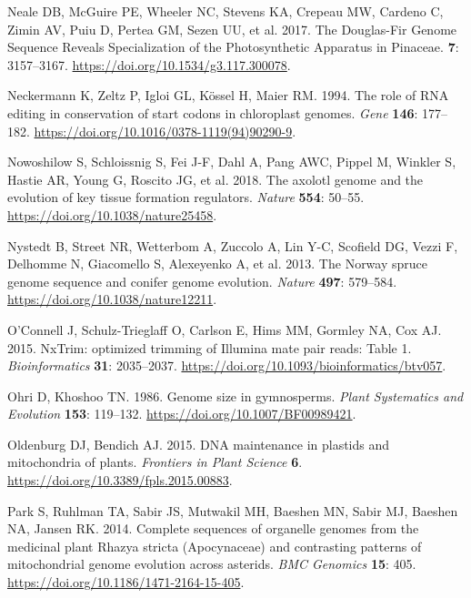 \documentclass[
  12pt,
  oneside,
  openany]{book}
\begin{document}
\leavevmode\hypertarget{ref-Neale_2017}{}%
Neale DB, McGuire PE, Wheeler NC, Stevens KA, Crepeau MW, Cardeno C, Zimin AV, Puiu D, Pertea GM, Sezen UU, et al. 2017. The Douglas-Fir Genome Sequence Reveals Specialization of the Photosynthetic Apparatus in Pinaceae. \textbf{7}: 3157--3167. \url{https://doi.org/10.1534/g3.117.300078}.

\leavevmode\hypertarget{ref-Neckermann_1994}{}%
Neckermann K, Zeltz P, Igloi GL, Kössel H, Maier RM. 1994. The role of RNA editing in conservation of start codons in chloroplast genomes. \emph{Gene} \textbf{146}: 177--182. \url{https://doi.org/10.1016/0378-1119(94)90290-9}.

\leavevmode\hypertarget{ref-Nowoshilow_2018}{}%
Nowoshilow S, Schloissnig S, Fei J-F, Dahl A, Pang AWC, Pippel M, Winkler S, Hastie AR, Young G, Roscito JG, et al. 2018. The axolotl genome and the evolution of key tissue formation regulators. \emph{Nature} \textbf{554}: 50--55. \url{https://doi.org/10.1038/nature25458}.

\leavevmode\hypertarget{ref-Nystedt_2013}{}%
Nystedt B, Street NR, Wetterbom A, Zuccolo A, Lin Y-C, Scofield DG, Vezzi F, Delhomme N, Giacomello S, Alexeyenko A, et al. 2013. The Norway spruce genome sequence and conifer genome evolution. \emph{Nature} \textbf{497}: 579--584. \url{https://doi.org/10.1038/nature12211}.

\leavevmode\hypertarget{ref-O_Connell_2015}{}%
O'Connell J, Schulz-Trieglaff O, Carlson E, Hims MM, Gormley NA, Cox AJ. 2015. NxTrim: optimized trimming of Illumina mate pair reads: Table 1. \emph{Bioinformatics} \textbf{31}: 2035--2037. \url{https://doi.org/10.1093/bioinformatics/btv057}.

\leavevmode\hypertarget{ref-Ohri_1986}{}%
Ohri D, Khoshoo TN. 1986. Genome size in gymnosperms. \emph{Plant Systematics and Evolution} \textbf{153}: 119--132. \url{https://doi.org/10.1007/BF00989421}.

\leavevmode\hypertarget{ref-Oldenburg_2015}{}%
Oldenburg DJ, Bendich AJ. 2015. DNA maintenance in plastids and mitochondria of plants. \emph{Frontiers in Plant Science} \textbf{6}. \url{https://doi.org/10.3389/fpls.2015.00883}.

\leavevmode\hypertarget{ref-Park_2014}{}%
Park S, Ruhlman TA, Sabir JS, Mutwakil MH, Baeshen MN, Sabir MJ, Baeshen NA, Jansen RK. 2014. Complete sequences of organelle genomes from the medicinal plant Rhazya stricta (Apocynaceae) and contrasting patterns of mitochondrial genome evolution across asterids. \emph{BMC Genomics} \textbf{15}: 405. \url{https://doi.org/10.1186/1471-2164-15-405}.
\end{document}
